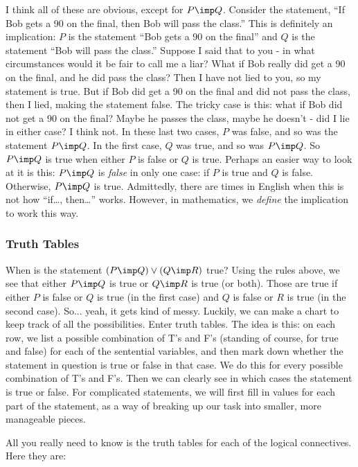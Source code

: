 I think all of these are obvious, except for $P \imp Q$.  Consider the statement, ``If Bob gets a 90 on the final, then Bob will pass the class.''  This is definitely an implication: $P$ is the statement ``Bob gets a 90 on the final'' and $Q$ is the statement ``Bob will pass the class.'' Suppose I said that to you - in what circumstances would it be fair to call me a liar?  What if Bob really did get a 90 on the final, and he did pass the class?  Then I have not lied to you, so my statement is true.  But if Bob did get a 90 on the final and did not pass the class, then I lied, making the statement false.  The tricky case is this: what if Bob did not get a 90 on the final?  Maybe he passes the class, maybe he doesn't - did I lie in either case?  I think not.  In these last two cases, $P$ was false, and so was the statement $P \imp Q$.  In the first case, $Q$ was true, and so was $P \imp Q$.  So $P \imp Q$ is true when either $P$ is false or $Q$ is true.  Perhaps an easier way to look at it is this: $P \imp Q$ is {\em false} in only one case: if $P$ is true and $Q$ is false.  Otherwise, $P \imp Q$ is true.  Admittedly, there are times in English when this is not how ``if\ldots, then\ldots'' works.  However, in mathematics, we {\em define} the implication to work this way.


\subsubsection*{Truth Tables}

When is the statement $(P \imp Q) \vee (Q \imp R)$ true?  Using the rules above, we see that either $P \imp Q$ is true or $Q \imp R$ is true (or both).  Those are true if either $P$ is false or $Q$ is true (in the first case) and $Q$ is false or $R$ is true (in the second case).  So... yeah, it gets kind of messy.  Luckily, we can make a chart to keep track of all the possibilities.  Enter truth tables.  The idea is this: on each row, we list a possible combination of T's and F's (standing of course, for true and false) for each of the sentential variables, and then mark down whether the statement in question is true or false in that case.  We do this for every possible combination of T's and F's.  Then we can clearly see in which cases the statement is true or false.  For complicated statements, we will first fill in values for each part of the statement, as a way of breaking up our task into smaller, more manageable pieces.

All you really need to know is the truth tables for each of the logical connectives.  Here they are:

